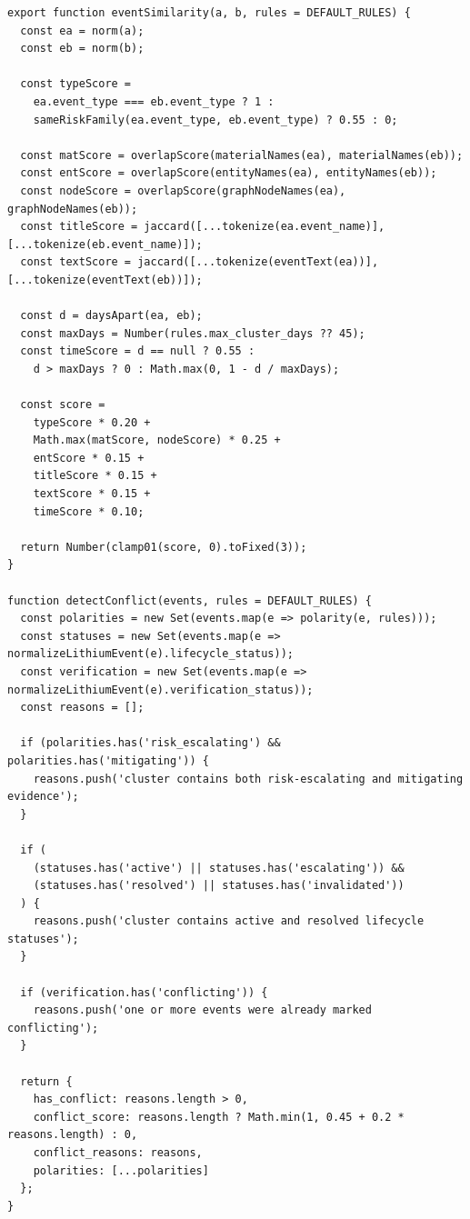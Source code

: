 ﻿\documentclass[12pt,a4paper]{article}
\begin{document}
\begin{lstlisting}[style=projectcode,caption={Trust Graph 事件相似度、聚类与置信度计算}]
export function eventSimilarity(a, b, rules = DEFAULT_RULES) {
  const ea = norm(a);
  const eb = norm(b);

  const typeScore =
    ea.event_type === eb.event_type ? 1 :
    sameRiskFamily(ea.event_type, eb.event_type) ? 0.55 : 0;

  const matScore = overlapScore(materialNames(ea), materialNames(eb));
  const entScore = overlapScore(entityNames(ea), entityNames(eb));
  const nodeScore = overlapScore(graphNodeNames(ea), graphNodeNames(eb));
  const titleScore = jaccard([...tokenize(ea.event_name)], [...tokenize(eb.event_name)]);
  const textScore = jaccard([...tokenize(eventText(ea))], [...tokenize(eventText(eb))]);

  const d = daysApart(ea, eb);
  const maxDays = Number(rules.max_cluster_days ?? 45);
  const timeScore = d == null ? 0.55 :
    d > maxDays ? 0 : Math.max(0, 1 - d / maxDays);

  const score =
    typeScore * 0.20 +
    Math.max(matScore, nodeScore) * 0.25 +
    entScore * 0.15 +
    titleScore * 0.15 +
    textScore * 0.15 +
    timeScore * 0.10;

  return Number(clamp01(score, 0).toFixed(3));
}

function detectConflict(events, rules = DEFAULT_RULES) {
  const polarities = new Set(events.map(e => polarity(e, rules)));
  const statuses = new Set(events.map(e => normalizeLithiumEvent(e).lifecycle_status));
  const verification = new Set(events.map(e => normalizeLithiumEvent(e).verification_status));
  const reasons = [];

  if (polarities.has('risk_escalating') && polarities.has('mitigating')) {
    reasons.push('cluster contains both risk-escalating and mitigating evidence');
  }

  if (
    (statuses.has('active') || statuses.has('escalating')) &&
    (statuses.has('resolved') || statuses.has('invalidated'))
  ) {
    reasons.push('cluster contains active and resolved lifecycle statuses');
  }

  if (verification.has('conflicting')) {
    reasons.push('one or more events were already marked conflicting');
  }

  return {
    has_conflict: reasons.length > 0,
    conflict_score: reasons.length ? Math.min(1, 0.45 + 0.2 * reasons.length) : 0,
    conflict_reasons: reasons,
    polarities: [...polarities]
  };
}


\end{lstlisting}
\end{document}
